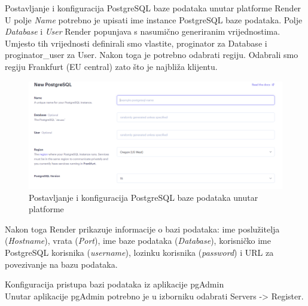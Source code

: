     \begin{packed_item}
		\item Postavljanje i konfiguracija PostgreSQL baze podataka unutar platforme Render \\
		
		U polje \textit{Name} potrebno je upisati ime instance PostgreSQL baze podataka. Polje \textit{Database} i \textit{User} Render popunjava s nasumično generiranim vrijednostima. Umjesto tih vrijednosti definirali smo vlastite, proginator za Database i proginator\_user za User. Nakon toga je potrebno odabrati regiju. Odabrali smo regiju Frankfurt (EU central) zato što je najbliža klijentu. 
		
		\begin{figure}[H]
			\includegraphics[width=\textwidth]{slike/Baza_podataka1.PNG} %
			\caption{Postavljanje i konfiguracija PostgreSQL baze podataka unutar platforme}
			\label{fig:bazapodataka1} %
		\end{figure}
		
		Nakon toga Render prikazuje informacije o bazi podataka: ime poslužitelja (\textit{Hostname}), vrata (\textit{Port}), ime baze podataka (\textit{Database}), korisničko ime PostgreSQL korisnika (\textit{username}), lozinku korisnika (\textit{password}) i URL za povezivanje na bazu podataka. 
		
		\item Konfiguracija pristupa bazi podataka iz aplikacije pgAdmin \\
		Unutar aplikacije pgAdmin potrebno je u izborniku odabrati Servers -> Register.
		

\end{packed_item}
